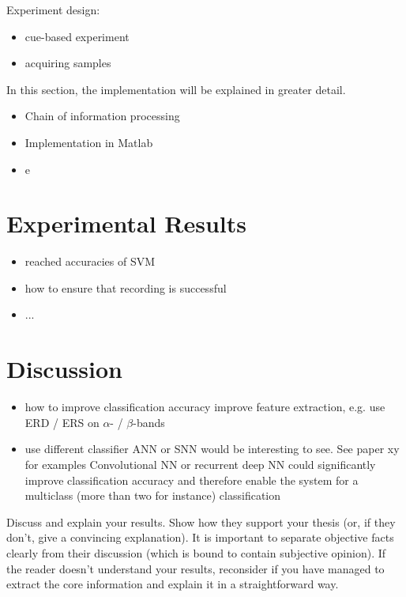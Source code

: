 \documentclass[a4paper,twoside, openright,12pt]{report}
\begin{document}
Experiment design:
\begin{itemize}
	\item cue-based experiment
	\item acquiring samples 
\end{itemize}

In this section, the implementation will be explained in greater detail. 
\begin{itemize}
	\item Chain of information processing
	\item Implementation in Matlab
	\item e
\end{itemize}


\section{Experimental Results}

\begin{itemize}
	\item reached accuracies of SVM
	\item how to ensure that recording is successful  
	\item ...
\end{itemize}


\section{Discussion}
\begin{itemize}
	\item how to improve classification accuracy
	\subitem improve feature extraction, e.g. use ERD / ERS on $\alpha$- / $\beta$-bands 
	\item use different classifier 
	\subitem ANN or SNN would be interesting to see. See paper xy for examples
	\subitem Convolutional NN or recurrent deep NN could significantly improve classification accuracy and therefore enable the system for a multiclass (more than two for instance) classification 
\end{itemize}


Discuss and explain your results. Show how they support your thesis (or, if they don't, give a convincing explanation). It is important to separate objective facts clearly from their discussion (which is bound to contain subjective opinion). If the reader doesn't understand your results, reconsider if you have managed to extract the core information and explain it in a straightforward way.
\end{document}
